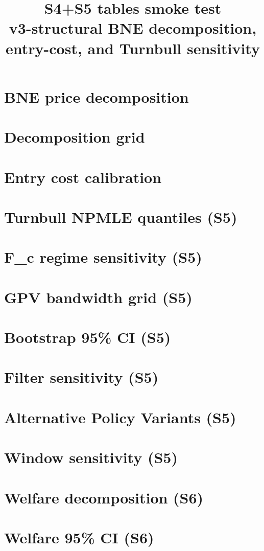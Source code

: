 \documentclass[11pt]{article}
\title{S4+S5 tables smoke test \\ \small v3-structural BNE decomposition, entry-cost, and Turnbull sensitivity}
\author{}
\date{}
\begin{document}
\maketitle

\section*{BNE price decomposition}


\section*{Decomposition grid}


\section*{Entry cost calibration}


\section*{Turnbull NPMLE quantiles (S5)}


\section*{F\_c regime sensitivity (S5)}


\section*{GPV bandwidth grid (S5)}


\section*{Bootstrap 95\% CI (S5)}


\section*{Filter sensitivity (S5)}


\section*{Alternative Policy Variants (S5)}


\section*{Window sensitivity (S5)}


\section*{Welfare decomposition (S6)}


\section*{Welfare 95\% CI (S6)}

\end{document}
